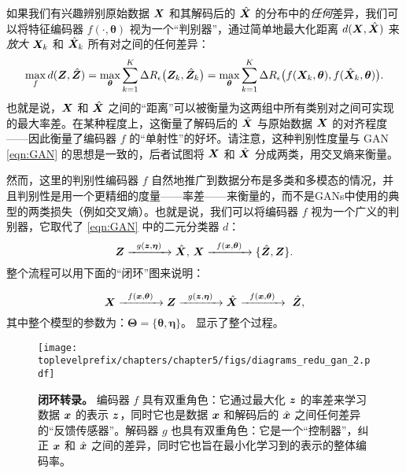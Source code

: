 \documentclass[../../book-main.tex]{subfiles}
\begin{document}
{如果我们有兴趣辨别原始数据 $\bm{X}$ 和其解码后的 $\hat {\bm{X}}$ 的分布中的{\em 任何}差异，我们可以将特征编码器 $f(\cdot, \bm \theta)$ 视为一个“判别器”，通过简单地最大化距离 $d(\bm{X}, \hat {\bm{X}})$ 来{\em 放大} $\bm{X}_k$ 和 $\hat {\bm{X}}_k$ 所有对之间的任何差异：
\begin{equation}
\max_f d(\bm{Z}, \hat {\bm{Z}}) = \max_{\bm \theta} \sum_{k=1}^K \Delta R_\epsilon\big(\bm{Z}_k, \hat{\bm{Z}}_k\big) = \max_{\bm \theta} \sum_{k=1}^K \Delta R_\epsilon\big(f(\bm{X}_k,\bm \theta), f(\hat{\bm{X}}_k,\bm \theta)\big).
    \label{eqn:max-distance}
\end{equation}
也就是说，$\bm{X}$ 和 $\hat {\bm{X}}$ 之间的“距离”可以被衡量为这两组中所有类别对之间可实现的最大率差。在某种程度上，这衡量了解码后的 $\hat {\bm{X}}$ 与原始数据 $\bm{X}$ 的对齐程度——因此衡量了编码器 $f$ 的“单射性”的好坏。请注意，这种判别性度量与 GAN \eqref{eqn:GAN} 的思想是一致的，后者试图将 $\bm{X}$ 和 $\hat {\bm{X}}$ 分成两类，用交叉熵来衡量。

然而，这里的判别性编码器 $f$ 自然地推广到数据分布是多类和多模态的情况，并且判别性是用一个更精细的度量——率差——来衡量的，而不是GANs中使用的典型的两类损失（例如交叉熵）。也就是说，我们可以将编码器 $f$ 视为一个广义的判别器，它取代了 \eqref{eqn:GAN} 中的二元分类器 $d$：
\begin{equation}
 \bm{Z} \xrightarrow{\hspace{2mm} g(\bm{z},\bm \eta) \hspace{2mm}} \hat {\bm{X}}, \, \bm{X} \xrightarrow{\hspace{2mm} f(\bm{x}, \bm \theta)\hspace{2mm}} \{\hat {\bm{Z}}, \bm{Z}\}.
 \label{eqn:closed-loop-GAN}
\end{equation}
整个流程可以用下面的“闭环”图来说明：}
\begin{equation}
    \bm{X} \xrightarrow{\hspace{2mm} f(\bm{x}, \bm \theta)\hspace{2mm}} \bm{Z} \xrightarrow{\hspace{2mm} g(\bm{z},\bm \eta) \hspace{2mm}} \hat {\bm{X}} \xrightarrow{\hspace{2mm} f(\bm{x}, \bm \theta)\hspace{2mm}} \ \hat {\bm{Z}}, 
\end{equation}
其中整个模型的参数为：$\bm \Theta = \{\bm \theta, \bm \eta\}$。  显示了整个过程。

\begin{figure}[t]
{\texttt{[image: \\toplevelprefix/chapters/chapter5/figs/diagrams\_redu\_gan\_2.pdf]}}
\caption{{\bf 闭环转录。} 编码器 $f$ 具有双重角色：它通过最大化 $\bm{z}$ 的率差来学习数据 $\bm{x}$ 的表示 $\bm{z}$，同时它也是数据 $\bm{x}$ 和解码后的 $\hat {\bm{x}}$ 之间任何差异的“反馈传感器”。解码器 $g$ 也具有双重角色：它是一个“控制器”，纠正 $\bm{x}$ 和 $\hat {\bm{x}}$ 之间的差异，同时它也旨在最小化学习到的表示的整体编码率。} \label{fig:auto-encoding-closed} 
\end{figure}
\end{document}
